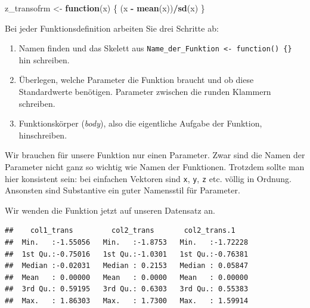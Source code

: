 \documentclass[]{book}
\newenvironment{Shaded}{\begin{snugshade}}{\end{snugshade}}
\newcommand{\ControlFlowTok}[1]{\textcolor[rgb]{0.13,0.29,0.53}{\textbf{#1}}}
\newcommand{\DataTypeTok}[1]{\textcolor[rgb]{0.13,0.29,0.53}{#1}}
\newcommand{\DecValTok}[1]{\textcolor[rgb]{0.00,0.00,0.81}{#1}}
\newcommand{\KeywordTok}[1]{\textcolor[rgb]{0.13,0.29,0.53}{\textbf{#1}}}
\newcommand{\NormalTok}[1]{#1}
\newcommand{\OperatorTok}[1]{\textcolor[rgb]{0.81,0.36,0.00}{\textbf{#1}}}
\newcommand{\StringTok}[1]{\textcolor[rgb]{0.31,0.60,0.02}{#1}}
\providecommand{\tightlist}{%
  \setlength{\itemsep}{0pt}\setlength{\parskip}{0pt}}
\begin{document}
\begin{Shaded}
\begin{Highlighting}[]
\NormalTok{z_transofrm <-}\StringTok{ }\ControlFlowTok{function}\NormalTok{(x) \{}
\NormalTok{  (x }\OperatorTok{-}\StringTok{ }\KeywordTok{mean}\NormalTok{(x))}\OperatorTok{/}\KeywordTok{sd}\NormalTok{(x)}
\NormalTok{\}}
\end{Highlighting}
\end{Shaded}

Bei jeder Funktionsdefinition arbeiten Sie drei Schritte ab:

\begin{enumerate}
\def\labelenumi{\arabic{enumi}.}
\tightlist
\item
  Namen finden und das Skelett aus \texttt{Name\_der\_Funktion\ \textless{}-\ function()\ \{\}} hin schreiben.
\item
  Überlegen, welche Parameter die Funktion braucht und ob diese Standardwerte benötigen. Parameter zwischen die runden Klammern schreiben.
\item
  Funktionskörper (\emph{body}), also die eigentliche Aufgabe der Funktion, hinschreiben.
\end{enumerate}

Wir brauchen für unsere Funktion nur einen Parameter. Zwar sind die Namen der Parameter nicht ganz so wichtig wie Namen der Funktionen. Trotzdem sollte man hier konsistent sein: bei einfachen Vektoren sind \texttt{x}, \texttt{y}, \texttt{z} etc. völlig in Ordnung. Ansonsten sind Substantive ein guter Namensstil für Parameter.

Wir wenden die Funktion jetzt auf unseren Datensatz an.

\begin{Shaded}
\end{Shaded}

\begin{verbatim}
##    col1_trans         col2_trans       col2_trans.1     
##  Min.   :-1.55056   Min.   :-1.8753   Min.   :-1.72228  
##  1st Qu.:-0.75016   1st Qu.:-1.0301   1st Qu.:-0.76381  
##  Median :-0.02031   Median : 0.2153   Median : 0.05847  
##  Mean   : 0.00000   Mean   : 0.0000   Mean   : 0.00000  
##  3rd Qu.: 0.59195   3rd Qu.: 0.6303   3rd Qu.: 0.55383  
##  Max.   : 1.86303   Max.   : 1.7300   Max.   : 1.59914
\end{verbatim}
\end{document}
